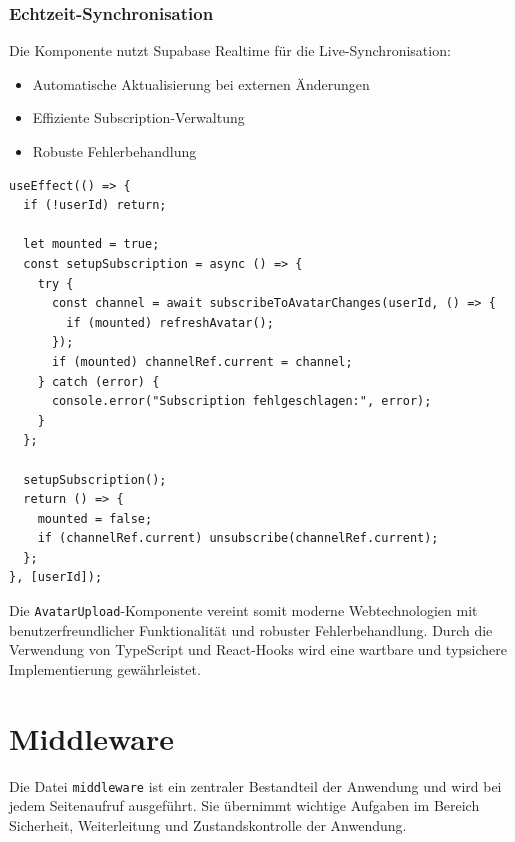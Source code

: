 \begin{inhalt}
\subsubsection{Echtzeit-Synchronisation}
Die Komponente nutzt Supabase Realtime für die Live-Synchronisation:
\begin{itemize}
    \item Automatische Aktualisierung bei externen Änderungen
    \item Effiziente Subscription-Verwaltung
    \item Robuste Fehlerbehandlung
\end{itemize}

\begin{lstlisting}[style=mytsx, caption={Implementierung der Echtzeit-Synchronisation}, label={lst:avatar_subscription}]
useEffect(() => {
  if (!userId) return;
  
  let mounted = true;
  const setupSubscription = async () => {
    try {
      const channel = await subscribeToAvatarChanges(userId, () => {
        if (mounted) refreshAvatar();
      });
      if (mounted) channelRef.current = channel;
    } catch (error) {
      console.error("Subscription fehlgeschlagen:", error);
    }
  };

  setupSubscription();
  return () => {
    mounted = false;
    if (channelRef.current) unsubscribe(channelRef.current);
  };
}, [userId]);
\end{lstlisting}

Die \texttt{AvatarUpload}-Komponente vereint somit moderne Webtechnologien mit benutzerfreundlicher Funktionalität und robuster Fehlerbehandlung. Durch die Verwendung von TypeScript und React-Hooks wird eine wartbare und typsichere Implementierung gewährleistet.







\newpage

\section{Middleware}
\label{ref:middelware}

Die Datei \texttt{middleware} ist ein zentraler Bestandteil der Anwendung und wird bei jedem Seitenaufruf ausgeführt.  
Sie übernimmt wichtige Aufgaben im Bereich Sicherheit, Weiterleitung und Zustandskontrolle der Anwendung.  



\end{inhalt}
